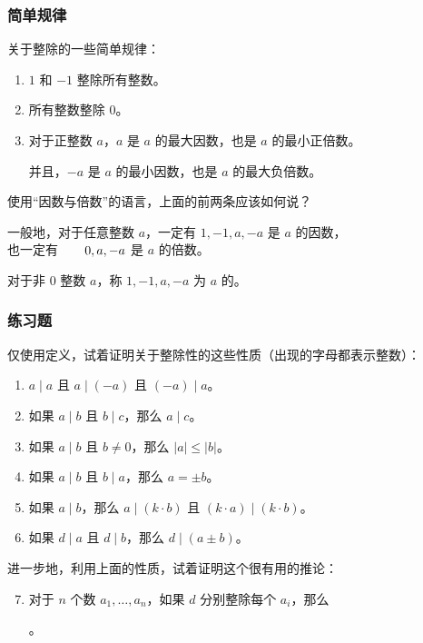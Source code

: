 \begin{frame}
  \frametitle{简单规律}
  关于整除的一些简单规律：
  \pause
  \begin{enumerate}
    \item $1$ 和 $-1$ 整除所有整数。
    \pause
    \item 所有整数整除 $0$。
    \pause
    \item 对于\alert{正}整数 $a$，$a$ 是 $a$ 的最大因数，也是 $a$ 的最小\alert{正}倍数。
    
    并且，$-a$ 是 $a$ 的最小因数，也是 $a$ 的最大负倍数。
  \end{enumerate}
  \pause
  使用“因数与倍数”的语言，上面的前两条应该如何说？
  \pause
  
  \emptyline
  一般地，对于任意整数 $a$，一定有 $1, -1, a, -a$ 是 $a$ 的因数，\\
  \-\hspace{10em}\hphantom{ $a$}也一定有 $\hphantom{0, -{}}0, a, -a$ 是 $a$ 的倍数。
  
  对于非 $0$ 整数 $a$，称 $1, -1, a, -a$ 为 $a$ 的。
\end{frame}
\begin{frame}
  \frametitle{练习题}
  仅使用定义，试着证明关于整除性的这些性质（出现的字母都表示整数）：
  \pause
  \begin{enumerate}
    \setlength{\itemsep}{2pt}
    \item $a \mid a$ 且 $a \mid (-a)$ 且 $(-a) \mid a$。
    \pause
    \item 如果 $a \mid b$ 且 $b \mid c$，那么 $a \mid c$。
    \pause
    \item 如果 $a \mid b$ 且 $b \ne 0$，那么 $\lvert a \rvert \le \lvert b \rvert$。
    \pause
    \item 如果 $a \mid b$ 且 $b \mid a$，那么 $a = \pm b$。
    \pause
    \item 如果 $a \mid b$，那么 $a \mid (k \cdot b)$ 且 $(k \cdot a) \mid (k \cdot b)$。
    \pause
    \item 如果 $d \mid a$ 且 $d \mid b$，那么 $d \mid (a \pm b)$。
  \end{enumerate}
  \pause
  进一步地，利用上面的性质，试着证明这个很有用的推论：
  \pause
  \begin{enumerate}
    \setcounter{enumi}{6}
    \item 对于 $n$ 个数 $a_1, \ldots, a_n$，如果 $d$ 分别整除每个 $a_i$，那么
    \begin{center}
      。
    \end{center}
  \end{enumerate}
\end{frame}
